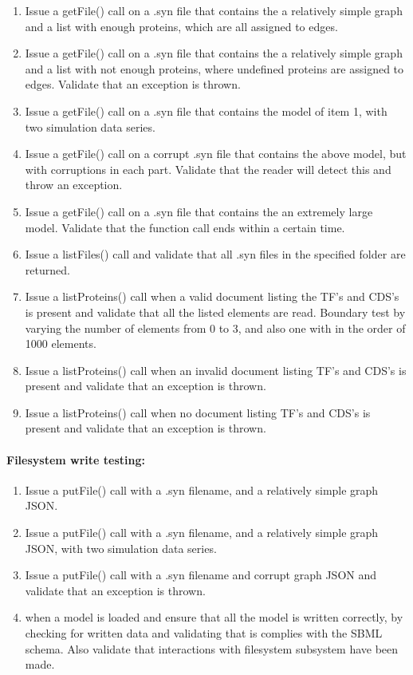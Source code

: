 \begin{enumerate}
\item Issue a getFile() call on a .syn file that contains the a relatively simple graph  and a list with enough proteins, which are all assigned to edges.

\item Issue a getFile() call on a .syn file that contains the a relatively simple graph  and a list with not enough proteins, where undefined proteins are assigned to edges. Validate that an exception is thrown.\item Issue a getFile() call on  a .syn file that contains the  model of item 1, with two simulation data series.
\item Issue a getFile() call on  a corrupt .syn file that contains the above model, but with corruptions in each part.
Validate that the reader will detect this and throw an exception.
\item Issue a getFile() call on  a .syn file that contains the an extremely large model. Validate that the function call ends within a certain time. 
\item Issue a listFiles() call and validate that all .syn files in the specified folder are returned.

\item Issue a listProteins() call when a valid document listing the TF's and CDS's is present and validate that all the listed elements are read.
 Boundary test by varying the number of elements from 0 to 3, and also one with in the order of 1000 elements.\item Issue a listProteins() call when an  invalid document listing TF's and CDS's is present and validate that an exception is thrown.
\item Issue a listProteins() call when no document listing TF's and CDS's is present and validate that an exception is thrown.\end{enumerate}

\paragraph{Filesystem write testing:}

\begin{enumerate}
\item Issue a putFile() call with a .syn filename, and a relatively simple graph JSON.
\item  Issue a putFile() call with a .syn filename, and a  relatively simple graph JSON, with two simulation data series.
\item  Issue a putFile() call with a .syn filename and corrupt graph JSON and validate that an exception is thrown. 
\item when a model is loaded and ensure that all the model is written correctly, by checking for written data and validating that is complies with the SBML schema. Also validate that interactions with filesystem subsystem have been made.
\end{enumerate}

